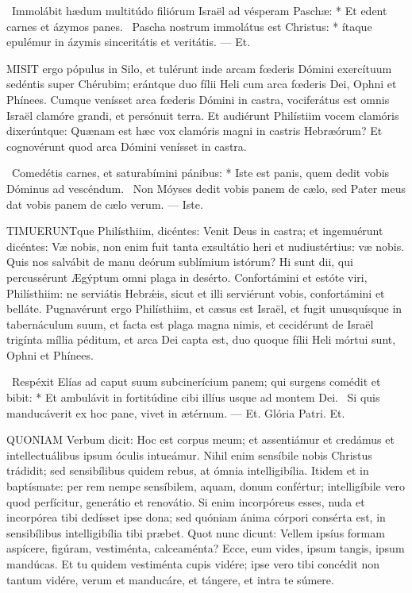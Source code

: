 \R\ Immolábit hædum multitúdo filiórum Israël ad vésperam Paschæ: * Et edent carnes et ázymos panes. \V\ Pascha nostrum immolátus est Christus: * ítaque epulémur in ázymis sinceritátis et veritátis. --- Et.


\lettrine[lines=2]{M}{ISIT} ergo pópulus in Silo, et tulérunt inde arcam fœderis Dómini exercítuum sedéntis super Chérubim; erántque duo fílii Heli cum arca fœderis Dei, Ophni et Phínees. Cumque venísset arca fœderis Dómini in castra, vociferátus est omnis Israël clamóre grandi, et persónuit terra. Et audiérunt Philístiim vocem clamóris dixerúntque: Quænam est hæc vox clamóris magni in castris Hebræórum? Et cognovérunt quod arca Dómini venísset in castra.

\R\ Comedétis carnes, et saturabímini pánibus: * Iste est panis, quem dedit vobis Dóminus ad vescéndum. \V\ Non Móyses dedit vobis panem de cælo, sed Pater meus dat vobis panem de cælo verum. --- Iste.


\lettrine[lines=2]{T}{IMUERUNT}que Philísthiim, dicéntes: Venit Deus in castra; et ingemuérunt dicéntes: Væ nobis, non enim fuit tanta exsultátio heri et nudiustértius: væ nobis. Quis nos salvábit de manu deórum sublímium istórum? Hi sunt dii, qui percussérunt Ægýptum omni plaga in desérto. Confortámini et estóte viri, Philísthiim: ne serviátis Hebrǽis, sicut et illi serviérunt vobis, confortámini et belláte. Pugnavérunt ergo Philísthiim, et cæsus est Israël, et fugit unusquísque in tabernáculum suum, et facta est plaga magna nimis, et cecidérunt de Israël trigínta míllia péditum, et arca Dei capta est, duo quoque fílii Heli mórtui sunt, Ophni et Phínees.

\R\ Respéxit Elías ad caput suum subcinerícium panem; qui surgens comédit et bibit: * Et ambulávit in fortitúdine cibi illíus usque ad montem Dei. \V\ Si quis manducáverit ex hoc pane, vivet in ætérnum. --- Et. Glória Patri. Et.





\lettrine[lines=2]{Q}{UONIAM} Verbum dicit: Hoc est corpus meum; et assentiámur et credámus et intellectuálibus ipsum óculis intueámur. Nihil enim sensíbile nobis Christus trádidit; sed sensibílibus quidem rebus, at ómnia intelligibília. Itidem et in baptísmate: per rem nempe sensíbilem, aquam, donum confértur; intelligíbile vero quod perfícitur, generátio et renovátio. Si enim incorpóreus esses, nuda et incorpórea tibi dedísset ipse dona; sed quóniam ánima córpori consérta est, in sensibílibus intelligibília tibi præbet. Quot nunc dicunt: Vellem ipsíus formam aspícere, figúram, vestiménta, calceaménta? Ecce, eum vides, ipsum tangis, ipsum mandúcas. Et tu quidem vestiménta cupis vidére; ipse vero tibi concédit non tantum vidére, verum et manducáre, et tángere, et intra te súmere.

